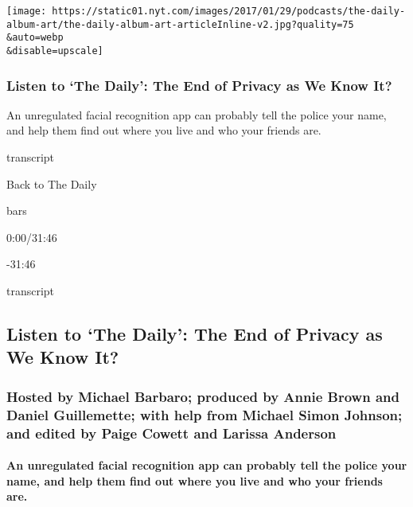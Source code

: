 \texttt{[image: https://static01.nyt.com/images/2017/01/29/podcasts/the-daily-album-art/the-daily-album-art-articleInline-v2.jpg?quality=75\\\&auto=webp\\\&disable=upscale]}

\hypertarget{listen-to-the-daily-the-end-of-privacy-as-we-know-it}{%
\subsubsection{Listen to `The Daily': The End of Privacy as We Know
It?}\label{listen-to-the-daily-the-end-of-privacy-as-we-know-it}}

An unregulated facial recognition app can probably tell the police your
name, and help them find out where you live and who your friends are.

transcript

Back to The Daily

bars

0:00/31:46

-31:46

transcript

\hypertarget{listen-to-the-daily-the-end-of-privacy-as-we-know-it-1}{%
\subsection{Listen to `The Daily': The End of Privacy as We Know
It?}\label{listen-to-the-daily-the-end-of-privacy-as-we-know-it-1}}

\hypertarget{hosted-by-michael-barbaro-produced-by-annie-brown-and-daniel-guillemette-with-help-from-michael-simon-johnson-and-edited-by-paige-cowett-and-larissa-anderson}{%
\subsubsection{Hosted by Michael Barbaro; produced by Annie Brown and
Daniel Guillemette; with help from Michael Simon Johnson; and edited by
Paige Cowett and Larissa
Anderson}\label{hosted-by-michael-barbaro-produced-by-annie-brown-and-daniel-guillemette-with-help-from-michael-simon-johnson-and-edited-by-paige-cowett-and-larissa-anderson}}

\hypertarget{an-unregulated-facial-recognition-app-can-probably-tell-the-police-your-name-and-help-them-find-out-where-you-live-and-who-your-friends-are}{%
\paragraph{An unregulated facial recognition app can probably tell the
police your name, and help them find out where you live and who your
friends
are.}\label{an-unregulated-facial-recognition-app-can-probably-tell-the-police-your-name-and-help-them-find-out-where-you-live-and-who-your-friends-are}}

